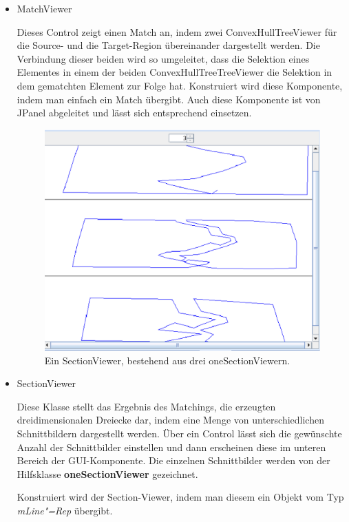 \begin{itemize}
\item MatchViewer

Dieses Control zeigt einen Match an, indem zwei ConvexHullTreeViewer für die Source- und die Target-Region übereinander dargestellt werden. Die Verbindung dieser beiden wird so umgeleitet, dass die Selektion eines Elementes in einem der beiden ConvexHullTreeTreeViewer die Selektion in dem gematchten Element zur Folge hat. Konstruiert wird diese Komponente, indem man einfach ein Match übergibt. Auch diese Komponente ist von JPanel abgeleitet und lässt sich entsprechend einsetzen.

\begin{figure}
	\centering
	\includegraphics[scale=0.5]{Sectionviewer.eps}
	\caption{Ein SectionViewer, bestehend aus drei oneSectionViewern.}
	\label{fig:SectionViewer}
\end{figure}


\item SectionViewer

Diese Klasse stellt das Ergebnis des Matchings, die erzeugten dreidimensionalen Dreiecke dar, indem eine Menge von unterschiedlichen Schnittbildern dargestellt werden. Über ein Control lässt sich die gewünschte Anzahl der Schnittbilder einstellen und dann erscheinen diese im unteren Bereich der GUI-Komponente. Die einzelnen Schnittbilder werden von der Hilfsklasse  \textbf{oneSectionViewer} gezeichnet.

Konstruiert wird der Section-Viewer, indem man diesem ein Objekt vom Typ \textit{mLine"=Rep} übergibt.



\end{itemize}
